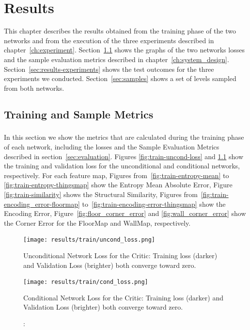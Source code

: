 \chapter{Results}
\label{sec:results}
This chapter describes the results obtained from the training phase of the two networks and from the execution of the three experiments described in chapter~\ref{ch:experiment}. Section~\ref{sec:results-training} shows the graphs of the two networks losses and the sample evaluation metrics described in chapter~\ref{ch:system_design}. Section~\ref{sec:results-experiments} shows the test outcomes for the three experiments we conducted. Section~\ref{sec:samples} shows a set of levels sampled from both networks.
\section{Training and Sample Metrics}
\label{sec:results-training}
\paragraph{} In this section we show the metrics that are calculated during the training phase of each network, including the losses and the Sample Evaluation Metrics described in section~\ref{sec:evaluation}. Figures \ref{fig:train-uncond-loss} and \ref{fig:train-cond-loss} show the training and validation loss for the unconditional and conditional networks, respectively. For each feature map, Figures from~\ref{fig:train-entropy-mean} to \ref{fig:train-entropy-thingsmap} show the Entropy Mean Absolute Error, Figure \ref{fig:train-similarity} shows the Structural Similarity, Figures from~\ref{fig:train-encoding_error-floormap} to~\ref{fig:train-encoding-error-thingsmap} show the Encoding Error, Figure~\ref{fig:floor_corner_error} and \ref{fig:wall_corner_error} show the Corner Error for the FloorMap and WallMap, respectively.

\begin{figure}[!htb] 
	\begin{minipage}[b]{\linewidth}
		\centering
		\texttt{[image: results/train/uncond\_loss.png]} 
		\caption[Unconditional Network Loss]: {Unconditional Network Loss for the Critic: Training loss (darker) and Validation Loss (brighter) both converge toward zero.}
		\label{fig:train-uncond-loss}
	\end{minipage}
	
	\begin{minipage}[b]{\linewidth}
	\centering
	\texttt{[image: results/train/cond\_loss.png]} 
	\caption[Conditional Network Loss]: {Conditional Network Loss for the Critic: Training loss (darker) and Validation Loss (brighter) both converge toward zero.}
	\label{fig:train-cond-loss}
\end{minipage}
\end{figure}

